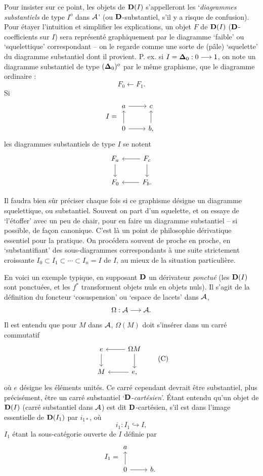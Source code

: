 Pour insister sur ce point, les objets de $\mathbf{D}(I)$ s'appelleront les `\textit{diagrammes substantiels} de type $I^o$ dans $\mathcal{A}$' (ou $\mathbf{D}$-substantiel, s'il y a risque de confusion). Pour étayer l'intuition et simplifier les explications, un objet $F$ de $\mathbf{D}(I)$ ($\mathbf{D}$-coefficients sur $I$) sera représenté graphiquement par le diagramme `faible' ou `squelettique' correspondant -- on le regarde
comme une sorte de (pâle) `squelette' du diagramme substantiel dont il provient. P. ex. si $I=\boldsymbol{\Delta}_0 : 0\longrightarrow 1$, on note un diagramme substantiel de type $(\boldsymbol{\Delta}_0)^o$ par le même graphisme, que le diagramme ordinaire :
\[
F_0 \longleftarrow F_1.
\]
Si
\[
I = \begin{tikzcd}
a \arrow[r] & c \\
0 \arrow[u] \arrow[r] & b, \arrow[u]
\end{tikzcd}
\]
les diagrammes substantiels de type $I$ se notent
\[
\begin{tikzcd}
F_a \arrow[d] & F_c \arrow[l] \arrow[d] \\
F_0 & F_b. \arrow[l]
\end{tikzcd}
\]

\clearpage


Il faudra bien sûr préciser chaque fois si ce graphisme désigne un diagramme squelettique, ou substantiel. Souvent on part d'un squelette, et on essaye de `l'étoffer' avec un peu de chair, pour en faire un diagramme substantiel -- si possible, de façon canonique. C'est là un point de philosophie dérivatique essentiel pour la pratique. On procédera souvent de proche en proche, en `substantifiant' des sous-diagrammes correspondants à une suite strictement croissante $I_0\subset I_1\subset\cdots\subset I_n=I$ de $I$, au mieux de la situation particulière.


En voici un exemple typique, en supposant $\mathbf{D}$ un dérivateur \textit{ponctué} (les $\mathbf{D}(I)$ sont ponctuées, et les $f^*$ transforment objets nuls en objets nuls). Il s'agit de la définition du foncteur `cosuspension' ou `espace de lacets' dans $\mathcal{A}$,
\[
\Omega : \mathcal{A} \longrightarrow \mathcal{A}.
\]
Il est entendu que pour $M$ dans $\mathcal{A}$, $\Omega(M)$ doit s'insérer dans un carré commutatif
\[
\begin{tikzcd}
e \arrow[d] & \Omega M \arrow[l] \arrow[d] \\
M & e, \arrow[l]
\end{tikzcd}
\tag*{(C)}
\]
où $e$ désigne les éléments unités. Ce carré cependant devrait être substantiel, plus précisément, être un carré substantiel `$\mathbf{D}$-\textit{cartésien}'. Étant entendu qu'un objet de $\mathbf{D}(I)$ (carré substantiel dans $\mathcal{A}$) est dit $\mathbf{D}$-cartésien, s'il est dans l'image essentielle de $\mathbf{D}(I_1)$ par $i_{1*}$, où
\[
i_1 : I_1 \hookrightarrow I,
\]
$I_1$ étant la sous-catégorie ouverte de $I$ définie par
\[
I_1 = \begin{tikzcd}
a \\
0 \arrow[u] \arrow[r] & b.
\end{tikzcd}
\]

